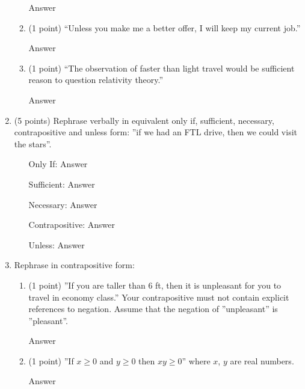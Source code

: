 \documentclass{article}
\begin{document}
\begin{enumerate}
\begin{enumerate}
        \color{blue}
            Answer
        \color{black}
    
        \item (1 point) “Unless you make me a better offer, I will keep my current job.”
        
        \color{blue}
            Answer
        \color{black}
        
        \item (1 point) “The observation of faster than light travel would be sufficient reason to question relativity theory.”
        
        \color{blue}
            Answer
        \color{black}
    \end{enumerate}
    
    \item (5 points) Rephrase verbally in equivalent only if, sufficient, necessary, contrapositive and unless form: ”if we had an FTL drive, then we could visit the stars”.

    \color{blue}
    \begin{itemize}
        \item[Only If:] Answer

        \item[Sufficient:] Answer
        
        \item[Necessary:] Answer
        
        \item[Contrapositive:] Answer
        
        \item[Unless:] Answer
    \end{itemize}
    \color{black}
    
    \item Rephrase in contrapositive form:
    \begin{enumerate}
        \item  (1 point) ”If you are taller than 6 ft, then it is unpleasant for you to travel in economy class.” Your contrapositive must not contain explicit references to negation. Assume that the negation of ”unpleasant” is ”pleasant”.
        
        \color{blue}
            Answer
        \color{black}
         
        \item  (1 point) ”If $x \geq 0$ and $y \geq 0$ then $xy \geq 0$” where $x$, $y$ are real numbers.
        
        \color{blue}
            Answer
        \color{black}
    \end{enumerate}
    

\end{enumerate}
\end{document}
